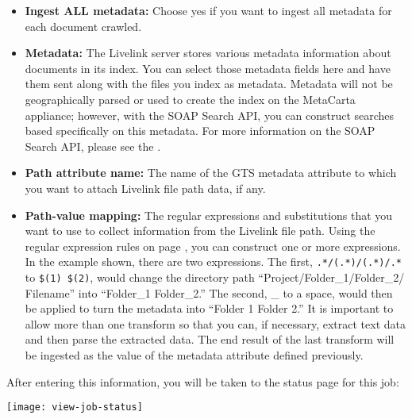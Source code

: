 \begin{itemize}

\item \textbf{Ingest ALL metadata:} Choose yes if you want to ingest all 
metadata for each document crawled.

\item \textbf{Metadata:} The Livelink server stores various metadata
information about documents in its index.  You can select those metadata
fields here and have them sent along with the files you index as metadata.
Metadata will not be geographically parsed or used to create the index
on the MetaCarta appliance; however, with the SOAP Search API, you
can construct searches based specifically on this metadata. For more
information on the SOAP Search API, please see the .

\item \textbf{Path attribute name:} The name of the GTS metadata
attribute to which you want to attach Livelink file path data, if any.

\item \textbf{Path-value mapping:} The regular expressions
and substitutions that you want to use to collect information
from the Livelink file path. Using the regular expression
rules on page \pageref{regex}, you can construct one or more
expressions. In the example shown, there are two expressions. The
first, \verb+.*/(.*)/(.*)/.*+ to \verb+$(1) $(2)+, would change the
directory path ``Project/Folder\_1/Folder\_2/ Filename'' into ``Folder\_1
Folder\_2.'' The second, \_ to a space, would then be applied to turn
the metadata into ``Folder 1 Folder 2.'' It is important to allow more
than one transform so that you can, if necessary, extract text data and
then parse the extracted data. The end result of the last transform will
be ingested as the value of the metadata attribute defined previously.

\end{itemize}

After entering this information, you will be taken to the status page
for this job:

\texttt{[image: view-job-status]}

